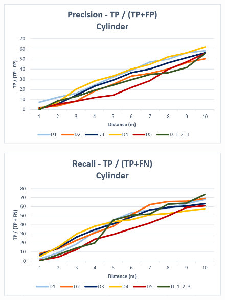 \documentclass{subfiles}
\begin{document}
   \begin{figure} [h!]
   	\centering
   	\includegraphics[width=\textwidth]{img/dead/results/Precision_Cylinder}
   	\caption{}
   	\label{fig:Precision_Cylinder}
   \end{figure}
   
     \begin{figure} [h!]
     	\centering
     	\includegraphics[width=\textwidth]{img/dead/results/Recall_Cylinder}
     	\caption{}
     	\label{fig:Recall_Cylinder}
     \end{figure}
     
\end{document}
